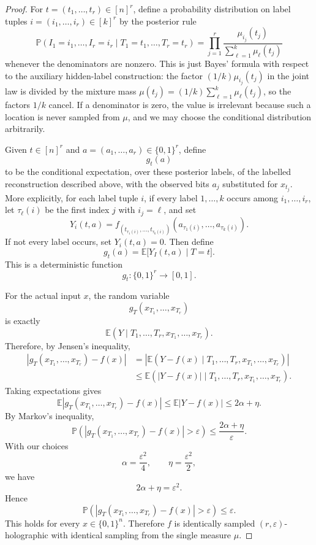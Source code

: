 \documentclass[10pt,a4paper]{amsart}
\begin{document}
\begin{proof}
For \(t=(t_1,\ldots,t_r)\in[n]^r\), define a probability distribution on label
tuples \(i=(i_1,\ldots,i_r)\in[k]^r\) by the posterior rule
\[
        \mathbb P(I_1=i_1,\ldots,I_r=i_r\mid T_1=t_1,\ldots,T_r=t_r)
        =
        \prod_{j=1}^r
        \frac{\mu_{i_j}(t_j)}
        {\sum_{\ell=1}^k \mu_\ell(t_j)}
\]
whenever the denominators are nonzero.  This is just Bayes' formula with
respect to the auxiliary hidden-label construction: the factor
\((1/k)\mu_{i_j}(t_j)\) in the joint law is divided by the mixture mass
\(\mu(t_j)=(1/k)\sum_{\ell=1}^k\mu_\ell(t_j)\), so the factors \(1/k\) cancel.
If a denominator is zero, the value is irrelevant because such a location is
never sampled from \(\mu\), and we may choose the conditional distribution
arbitrarily.

Given \(t\in[n]^r\) and \(a=(a_1,\ldots,a_r)\in\{0,1\}^r\), define
\[
        g_t(a)
\]
to be the conditional expectation, over these posterior labels, of the labelled
reconstruction described above, with the observed bits \(a_j\) substituted for
\(x_{t_j}\).  More explicitly, for each label tuple \(i\), if every label
\(1,\ldots,k\) occurs among \(i_1,\ldots,i_r\), let \(\tau_\ell(i)\) be the
first index \(j\) with \(i_j=\ell\), and set
\[
        Y_i(t,a)
        =
        f_{(t_{\tau_1(i)},\ldots,t_{\tau_k(i)})}
        (a_{\tau_1(i)},\ldots,a_{\tau_k(i)}).
\]
If not every label occurs, set \(Y_i(t,a)=0\).  Then define
\[
        g_t(a)
        =
        \mathbb E\bigl[ Y_I(t,a)\mid T=t\bigr].
\]
This is a deterministic function
\[
        g_t:\{0,1\}^r\to[0,1].
\]

For the actual input \(x\), the random variable
\[
        g_T(x_{T_1},\ldots,x_{T_r})
\]
is exactly
\[
        \mathbb E(Y\mid T_1,\ldots,T_r,x_{T_1},\ldots,x_{T_r}).
\]
Therefore, by Jensen's inequality,
\[
\begin{aligned}
        \left|
        g_T(x_{T_1},\ldots,x_{T_r})-f(x)
        \right|
        &=
        \left|
        \mathbb E(Y-f(x)\mid T_1,\ldots,T_r,x_{T_1},\ldots,x_{T_r})
        \right|                                                   \\
        &\leq
        \mathbb E\left(
        |Y-f(x)|
        \mid T_1,\ldots,T_r,x_{T_1},\ldots,x_{T_r}
        \right).
\end{aligned}
\]
Taking expectations gives
\[
        \mathbb E
        \left|
        g_T(x_{T_1},\ldots,x_{T_r})-f(x)
        \right|
        \leq
        \mathbb E |Y-f(x)|
        \leq
        2\alpha+\eta .
\]
By Markov's inequality,
\[
        \mathbb P\left(
        \left|
        g_T(x_{T_1},\ldots,x_{T_r})-f(x)
        \right|
        >\varepsilon
        \right)
        \leq
        \frac{2\alpha+\eta}{\varepsilon}.
\]
With our choices
\[
        \alpha=\frac{\varepsilon^2}{4},
        \qquad
        \eta=\frac{\varepsilon^2}{2},
\]
we have
\[
        2\alpha+\eta=\varepsilon^2.
\]
Hence
\[
        \mathbb P\left(
        \left|
        g_T(x_{T_1},\ldots,x_{T_r})-f(x)
        \right|
        >\varepsilon
        \right)
        \leq \varepsilon .
\]
This holds for every \(x\in\{0,1\}^n\).  Therefore \(f\) is
identically sampled \((r,\varepsilon)\)-holographic with identical sampling
from the single measure \(\mu\).
\end{proof}
\end{document}
